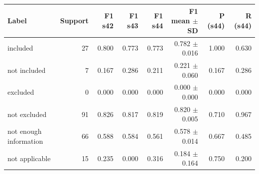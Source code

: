 \begin{tabular}{lrrrrrrr}
\toprule
Label & Support & F1 s42 & F1 s43 & F1 s44 & F1 mean $\pm$ SD & P (s44) & R (s44) \\
\midrule
included & 27 & 0.800 & 0.773 & 0.773 & 0.782 $\pm$ 0.016 & 1.000 & 0.630 \\
not included & 7 & 0.167 & 0.286 & 0.211 & 0.221 $\pm$ 0.060 & 0.167 & 0.286 \\
excluded & 0 & 0.000 & 0.000 & 0.000 & 0.000 $\pm$ 0.000 & 0.000 & 0.000 \\
not excluded & 91 & 0.826 & 0.817 & 0.819 & 0.820 $\pm$ 0.005 & 0.710 & 0.967 \\
not enough information & 66 & 0.588 & 0.584 & 0.561 & 0.578 $\pm$ 0.014 & 0.667 & 0.485 \\
not applicable & 15 & 0.235 & 0.000 & 0.316 & 0.184 $\pm$ 0.164 & 0.750 & 0.200 \\
\bottomrule
\end{tabular}
